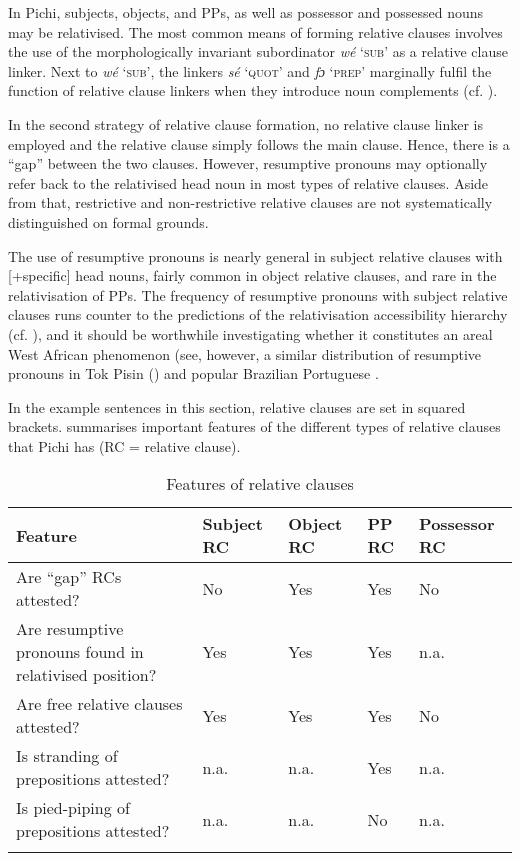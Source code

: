 In Pichi, subjects, objects, and PPs, as well as possessor and possessed nouns may be relativised. The most common means of forming relative clauses involves the use of the morphologically invariant subordinator \textit{wé} ‘\textsc{sub}’ as a relative clause linker. Next to \textit{wé} ‘\textsc{sub}’, the linkers \textit{sé} ‘\textsc{quot}’ and \textit{fɔ} ‘\textsc{prep}’ marginally fulfil the function of relative clause linkers when they introduce noun complements (cf. ).


In the second strategy of relative clause formation, no relative clause linker is employed and the relative clause simply follows the main clause. Hence, there is a “gap” between the two clauses. However, resumptive pronouns may optionally refer back to the relativised head noun in most types of relative clauses. Aside from that, restrictive and non-restrictive relative clauses are not systematically distinguished on formal grounds. 


The use of resumptive pronouns is nearly general in subject relative clauses with [+specific] head nouns, fairly common in object relative clauses, and rare in the relativisation of PPs. The frequency of resumptive pronouns with subject relative clauses runs counter to the predictions of the relativisation accessibility hierarchy (cf. \citealt{KeenanComrie1977}), and it should be worthwhile investigating whether it constitutes an areal West African phenomenon (see, however, a similar distribution of resumptive pronouns in Tok Pisin (\citealt{SankoffBrown1976}) and popular Brazilian Portuguese \citep{Tarallo1983}.


In the example sentences in this section, relative clauses are set in squared brackets.  summarises important features of the different types of relative clauses that Pichi has (RC = relative clause).


\begin{table}
\caption{Features of relative clauses}
\label{tab:key:10.3}

\begin{tabularx}{\textwidth}{Qllll}
\lsptoprule
Feature & Subject RC & Object RC & PP RC & Possessor RC\\
\midrule 
Are “gap” RCs attested? & No & Yes & Yes & No\\
\tablevspace 
Are resumptive pronouns found in relativised position? & Yes & Yes & Yes & n.a.\\
\tablevspace 
Are free relative clauses attested? & Yes & Yes & Yes & No\\
\tablevspace 
Is stranding of prepositions attested? & n.a. & n.a. & Yes & n.a.\\
\tablevspace 
Is pied-piping of prepositions attested? & n.a. & n.a. & No & n.a.\\
\lspbottomrule
\end{tabularx}
\end{table}
